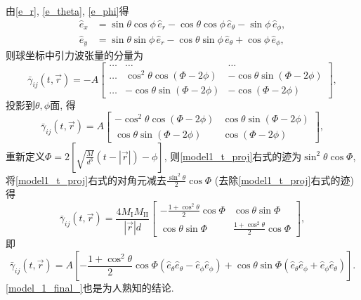 \documentclass[12pt]{ctexart}
\begin{document}
由\eqref{e_r}, \eqref{e_theta}, \eqref{e_phi}得
\begin{align}
    \hat{e}_x&=\sin\theta\cos\phi\,\hat{e}_r-\cos\theta\cos\phi\,\hat{e}_\theta-\sin\phi\,\hat{e}_\phi,\\
    \hat{e}_y&=\sin\theta\sin\phi\,\hat{e}_r-\cos\theta\sin\phi\,\hat{e}_\theta+\cos\phi\,\hat{e}_\phi,
\end{align}
则球坐标中引力波张量的分量为
\begin{equation}
    \bar{\gamma}_{ij}(t,\vec{r})=-A
    \begin{bmatrix}
        \dots&\dots&\dots\\
        \dots&\cos^2\theta\cos(\Phi-2\phi)&-\cos\theta\sin(\Phi-2\phi)\\
        \dots&-\cos\theta\sin(\Phi-2\phi)&-\cos(\Phi-2\phi)
    \end{bmatrix},
\end{equation}
投影到$\theta,\phi$面, 得
\begin{equation}
    \bar{\gamma}_{ij}(t,\vec{r})=A
    \begin{bmatrix}
        -\cos^2\theta\cos(\Phi-2\phi)&\cos\theta\sin(\Phi-2\phi)\\
        \cos\theta\sin(\Phi-2\phi)&\cos(\Phi-2\phi)
    \end{bmatrix},\label{model1_t_proj}
\end{equation}
重新定义$\Phi=2\left[\sqrt{\frac{ M}{d^3}}\left(t-\left\lvert\vec{r}\right\rvert\right)-\phi\right]$, 则\eqref{model1_t_proj}右式的迹为$\sin^2\theta\cos\Phi$, 将\eqref{model1_t_proj}右式的对角元减去$\frac{\sin^2\theta}{2}\cos\Phi$ (去除\eqref{model1_t_proj}右式的迹)得
\begin{equation}
    \bar{\gamma}_{ij}(t,\vec{r})=\frac{4 M_\text{I}M_\text{II}}{\left\lvert\vec{r}\right\rvert d}
    \begin{bmatrix}
        -\frac{1+\cos^2\theta}{2}\cos\Phi&\cos\theta\sin\Phi\\
        \cos\theta\sin\Phi&\frac{1+\cos^2\theta}{2}\cos\Phi
    \end{bmatrix},\label{1f}
\end{equation}
即
\begin{equation}
    \bar{\gamma}_{ij}(t,\vec{r})=A\left[-\frac{1+\cos^2\theta}{2}\cos\Phi\left(\hat{e}_\theta\hat{e}_\theta-\hat{e}_\phi\hat{e}_\phi\right)+\cos\theta\sin\Phi\left(\hat{e}_\theta\hat{e}_\phi+\hat{e}_\phi\hat{e}_\theta\right)\right].\label{model_1_final_}
\end{equation}
\eqref{model_1_final_}也是为人熟知的结论\cite{Apostolatos1994}.
\end{document}
